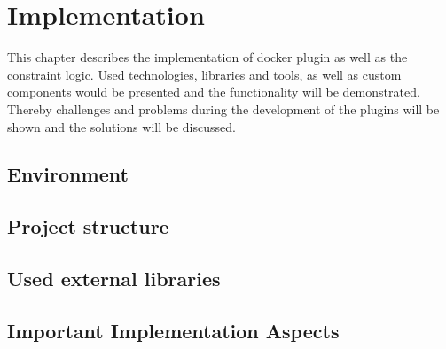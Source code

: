 \acresetall

\chapter{Implementation}\label{chapter:implementation}
This chapter describes the implementation of docker plugin as well as the constraint logic.
Used technologies, libraries and tools, as well as custom components would be presented and the functionality will be demonstrated.
Thereby challenges and problems during the development of the plugins will be shown and the solutions will be discussed.

\section{Environment}
\doit

\section{Project structure}

\doit

\section{Used external libraries}
\doit

\section{Important Implementation Aspects}

